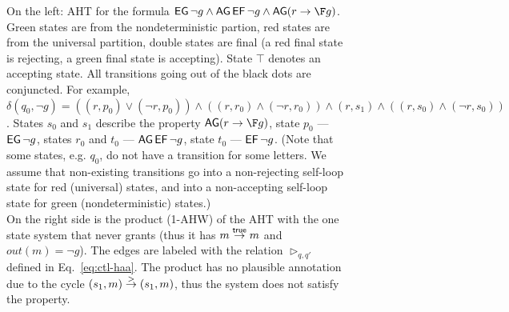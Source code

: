 \begin{figure}
\begin{subfigure}[b]{0.45\textwidth}
\end{subfigure}
\caption{On the left: AHT for the \CTLstar formula
         $\EG\neg g \land \AG\EF \neg g \land \AG(r \impl \F g)$.
         Green states are from the nondeterministic partion,
         red states are from the universal partition,
         double states are final
         (a red final state is rejecting, a green final state is accepting).
         State $\top$ denotes an accepting state.
         All transitions going out of the black dots are conjuncted.
         For example,
         $\delta(q_0, \neg g) =
         ((r,p_0) \lor (\neg r,p_0)) \land
         ((r,r_0) \land (\neg r, r_0)) \land
         (r, s_1) \land
         ((r,s_0) \land (\neg r, s_0))$.
         States $s_0$ and $s_1$ describe the property $\AG(r \impl \F g)$,
         state $p_0$ --- $\operatorname{\mathsf{EG}} \neg g$,
         states $r_0$ and $t_0$ --- $\operatorname{\mathsf{AG}}\operatorname{\mathsf{EF}}\neg g$,
         state $t_0$ --- $\operatorname{\mathsf{EF}}\neg g$.
         (Note that some states, e.g. $q_0$, do not have a transition for some letters.
          We assume that non-existing transitions go into a non-rejecting self-loop state for red (universal) states,
          and into a non-accepting self-loop state for green (nondeterministic) states.)\\
         On the right side is the product (1-AHW) of the AHT with 
         the one state system that never grants
         (thus it has $m \stackrel{{\textsf{true}}}{\rightarrow} m$ and $out(m) = \neg g$).
         The edges are labeled with the relation $\triangleright_{q,q'}$
         defined in Eq.~\ref{eq:ctl-haa}.
         The product has no plausible annotation due to
         the cycle $(s_1,m) \stackrel{{>}}{\rightarrow} (s_1,m)$,
         thus the system does not satisfy the property.}
\label{fig:aht-resettable-arbiter}
\end{figure}
